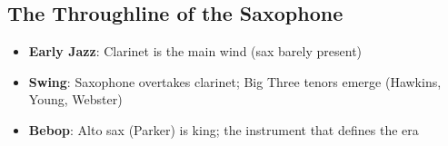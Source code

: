 \documentclass[11pt,letterpaper]{article}
\begin{document}
\subsection{The Throughline of the Saxophone}
\begin{itemize}[leftmargin=1.5em]
  \item \textbf{\textcolor{week1color}{Early Jazz}}: Clarinet is the main wind (sax barely present)
  \item \textbf{\textcolor{week2color}{Swing}}: Saxophone overtakes clarinet; Big Three tenors emerge (Hawkins, Young, Webster)
  \item \textbf{\textcolor{week3color}{Bebop}}: Alto sax (Parker) is king; the instrument that defines the era
\end{itemize}
\end{document}

